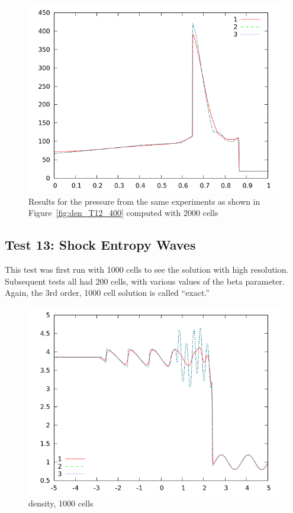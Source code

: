 \documentclass[10pt]{article}
\begin{document}
\begin{figure}[h]
  \begin{center}
     \includegraphics[width=.78\textwidth]{prs_T12_2000.png}	
  \end{center}
  \caption{Results for the pressure from the same experiments as shown in Figure~\ref{fig:den_T12_400} computed with 2000 cells}
\end{figure}

\clearpage

\subsection{Test 13: Shock Entropy Waves}

This test was first run with 1000 cells to see the solution with high resolution. Subsequent tests all had 200 cells, with various values of the beta parameter. Again, the 3rd order, 1000 cell solution is called ``exact.''

\begin{figure}[h]
  \begin{center}
     \includegraphics[width=.78\textwidth]{1000.png}	
  \end{center}
  \caption{density, 1000 cells}
\end{figure}
\end{document}
